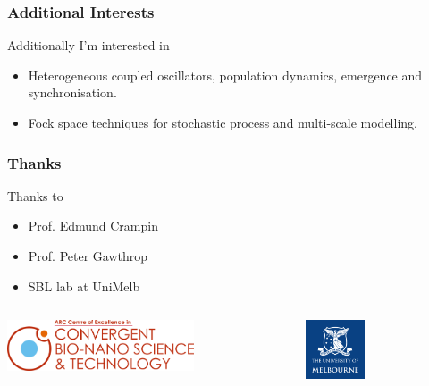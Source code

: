 \documentclass[12pt,reqno]{beamer}
\begin{document}
\begin{frame}
\frametitle{Additional Interests}
Additionally I'm interested in
\begin{itemize}
	\item Heterogeneous coupled oscillators, population dynamics, emergence and synchronisation. 
	\item Fock space techniques for stochastic process and multi-scale modelling.
\end{itemize}
\end{frame}


\begin{frame}
\frametitle{Thanks}
{\small
Thanks to
\begin{itemize}
		\itemsep1em
\item Prof. Edmund Crampin 
\item Prof. Peter Gawthrop
\item SBL lab at UniMelb
\end{itemize}
}
\vfill
\begin{columns}
	\begin{column}{0.4\textwidth}
		\centering
\includegraphics[height=1.5cm]{cbns-logo}
\end{column}
	\begin{column}{0.5\textwidth}
		\centering
 \includegraphics[width=1.75cm]{PRIMARY_A_Vertical_Housed_RGB.png}
 \end{column}
\end{columns}
\end{frame}
\end{document}

